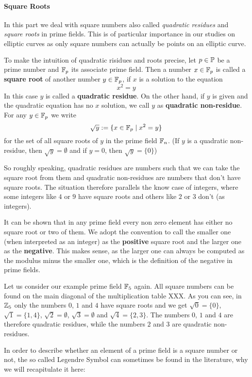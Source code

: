 \paragraph{Square Roots}
In this part we deal with square numbers also called \textit{quadratic residues} and \textit{square roots} in prime fields. This is of particular importance in our studies on elliptic curves as only square numbers can actually be points on an elliptic curve. 

To make the intuition of quadratic risidues and roots precise, let $p \in \mathbb{P} $ be a prime number and $\mathbb{F}_p $ its associate prime field. Then a number $x\in \mathbb{F}_p$ is called a \textbf{square root} of another number $y\in\mathbb{F}_p$, if $x$ is a solution to the equation
\begin{equation}
x^2 = y
\end{equation}
In this case $y$ is called a \textbf{quadratic residue}. On the other hand, if $y$ is given and the quadratic equation has no $x$ solution, we call $ y $ as \textbf{quadratic non-residue}. For any $ y \in \mathbb{F}_p $ we write
\begin{equation}
\sqrt{y}: = \{x \in \mathbb{F}_p \; | \; x^2 = y \}
\end{equation}
for the set of all square roots of $ y $ in the prime field $ \mathbb{F}_n $. (If $ y $ is a quadratic non-residue, then $ \sqrt{y} = \emptyset $ and if $ y = 0 $, then $ \sqrt{y} = \{0 \} $)

So roughly speaking, quadratic residues are numbers such that we can take the square root from them and quadratic non-residues are numbers that don't have square roots. The situation therefore parallels the know case of integers, where some integers like $4$ or $9$ have square roots and others like $2$ or $3$ don't (as integers).

It can be shown that in any prime field every non zero element has either no square root or two of them. We adopt the convention to call the smaller one (when interpreted as an integer) as the \textbf{positive} square root and the larger one as the \textbf{negative}. This makes sense, as the larger one can always be computed as the modulus minus the smaller one, which is the definition of the negative in prime fields. 


\begin{example}  Let us consider our example prime field $\mathbb{F}_5$ again. All square numbers can be found on the main diagonal of the multiplication table XXX. As you can see, in $ \mathbb{Z}_5 $ only the numbers $ 0 $, $ 1 $ and $ 4 $ have square roots and we get $ \sqrt{0} = \{0 \} $, $ \sqrt{1} = \{1,4 \} $, $ \sqrt{2} = \emptyset $, $ \sqrt{3} = \emptyset $ and $ \sqrt{4} = \{2,3 \} $. The numbers $0$, $1$ and $4$ are therefore quadratic residues, while the numbers $2$ and $3$ are quadratic non-residues.
\end{example}
In order to describe whether an element of a prime field is a square number  or not, the so called Legendre Symbol can sometimes be found in the literature, why we will recapitulate it here:

